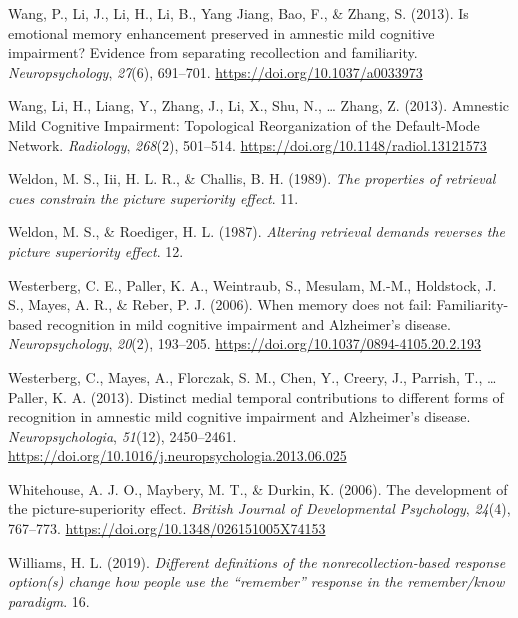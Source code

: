 \documentclass[
  11pt,
]{article}
\begin{document}
\leavevmode\hypertarget{ref-wang2013a}{}%
Wang, P., Li, J., Li, H., Li, B., Yang Jiang, Bao, F., \& Zhang, S.
(2013). Is emotional memory enhancement preserved in amnestic mild
cognitive impairment? Evidence from separating recollection and
familiarity. \emph{Neuropsychology}, \emph{27}(6), 691--701.
\url{https://doi.org/10.1037/a0033973}

\leavevmode\hypertarget{ref-wang2013}{}%
Wang, Li, H., Liang, Y., Zhang, J., Li, X., Shu, N., \ldots{} Zhang, Z.
(2013). Amnestic Mild Cognitive Impairment: Topological Reorganization
of the Default-Mode Network. \emph{Radiology}, \emph{268}(2), 501--514.
\url{https://doi.org/10.1148/radiol.13121573}

\leavevmode\hypertarget{ref-weldon1989}{}%
Weldon, M. S., Iii, H. L. R., \& Challis, B. H. (1989). \emph{The
properties of retrieval cues constrain the picture superiority effect}.
11.

\leavevmode\hypertarget{ref-weldon1987}{}%
Weldon, M. S., \& Roediger, H. L. (1987). \emph{Altering retrieval
demands reverses the picture superiority effect}. 12.

\leavevmode\hypertarget{ref-westerberg2006}{}%
Westerberg, C. E., Paller, K. A., Weintraub, S., Mesulam, M.-M.,
Holdstock, J. S., Mayes, A. R., \& Reber, P. J. (2006). When memory does
not fail: Familiarity-based recognition in mild cognitive impairment and
Alzheimer's disease. \emph{Neuropsychology}, \emph{20}(2), 193--205.
\url{https://doi.org/10.1037/0894-4105.20.2.193}

\leavevmode\hypertarget{ref-westerberg2013}{}%
Westerberg, C., Mayes, A., Florczak, S. M., Chen, Y., Creery, J.,
Parrish, T., \ldots{} Paller, K. A. (2013). Distinct medial temporal
contributions to different forms of recognition in amnestic mild
cognitive impairment and Alzheimer's disease. \emph{Neuropsychologia},
\emph{51}(12), 2450--2461.
\url{https://doi.org/10.1016/j.neuropsychologia.2013.06.025}

\leavevmode\hypertarget{ref-whitehouse2006}{}%
Whitehouse, A. J. O., Maybery, M. T., \& Durkin, K. (2006). The
development of the picture-superiority effect. \emph{British Journal of
Developmental Psychology}, \emph{24}(4), 767--773.
\url{https://doi.org/10.1348/026151005X74153}

\leavevmode\hypertarget{ref-williams2019}{}%
Williams, H. L. (2019). \emph{Different definitions of the
nonrecollection-based response option(s) change how people use the
``remember'' response in the remember/know paradigm}. 16.
\end{document}
